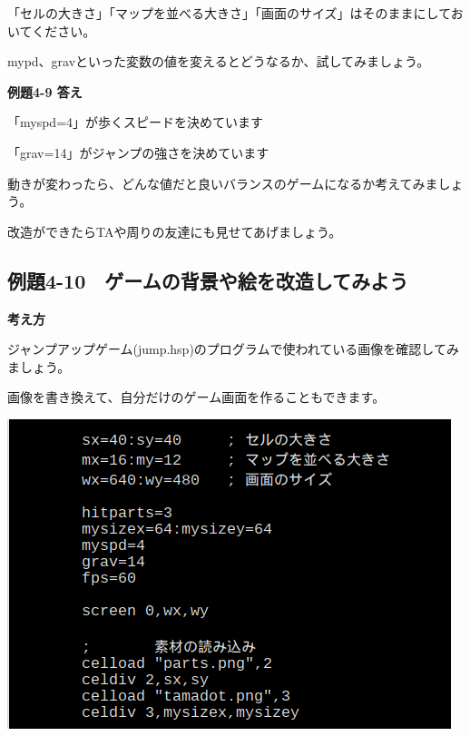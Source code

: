 \documentclass[a4paper,12pt]{jarticle}
\begin{document}
\bigskip
\bigskip
\bigskip

「セルの大きさ」「マップを並べる大きさ」「画面のサイズ」はそのままにしておいてください。

mypd、gravといった変数の値を変えるとどうなるか、試してみましょう。


\bigskip


\bigskip


\bigskip


\bigskip

{\bfseries
例題4-9 答え}


\bigskip

「myspd=4」が歩くスピードを決めています

「grav=14」がジャンプの強さを決めています


\bigskip

動きが変わったら、どんな値だと良いバランスのゲームになるか考えてみましょう。

改造ができたらTAや周りの友達にも見せてあげましょう。


\clearpage
\subsection{例題4-10　ゲームの背景や絵を改造してみよう}
\bigskip
\bigskip

{\bfseries
考え方}

\bigskip

ジャンプアップゲーム(jump.hsp)のプログラムで使われている画像を確認してみましょう。

画像を書き換えて、自分だけのゲーム画面を作ることもできます。

\bigskip
\bigskip

\begin{minipage}{9.781cm}
\centering
{\upshape
\includegraphics[keepaspectratio]{text04-img/text04-img026.png}}
\end{minipage}
\end{document}
